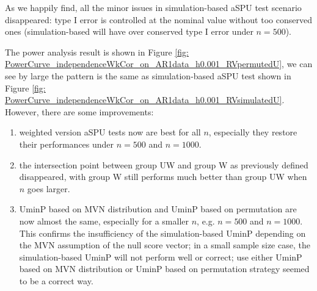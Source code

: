 \documentclass[12pt]{article}
\begin{document}
\begin{itemize}
%
%
%



As we happily find, all the minor issues in simulation-based aSPU test scenario disappeared: type I error is controlled at the nominal value without too conserved ones (simulation-based will have over conserved type I error under $n = 500$).

The power analysis result is shown in Figure \ref{fig: PowerCurve_independenceWkCor_on_AR1data_h0.001_RVpermutedU}, we can see by large the pattern is the same as simulation-based aSPU test shown in Figure \ref{fig: PowerCurve_independenceWkCor_on_AR1data_h0.001_RVsimulatedU}. However, there are some improvements: 
\begin{enumerate}
\item  weighted version aSPU tests now are best for all $n$, especially they restore their performances under $n = 500$ and $n = 1000$.
\item the intersection point between group UW and group W as previously defined disappeared, with group W still performs much better than group UW when $n$ goes larger.
\item UminP based on MVN distribution and UminP based on permutation are now almost the same, especially for a smaller $n$, e.g. $n = 500$ and $n = 1000$. \\
This confirms the insufficiency of the simulation-based UminP depending on the MVN assumption of the null score vector; in a small sample size case, the simulation-based UminP will not perform well or correct; use either UminP based on MVN distribution or UminP based on permutation strategy seemed to be a correct way.
\end{enumerate}


\end{itemize}
\end{document}
